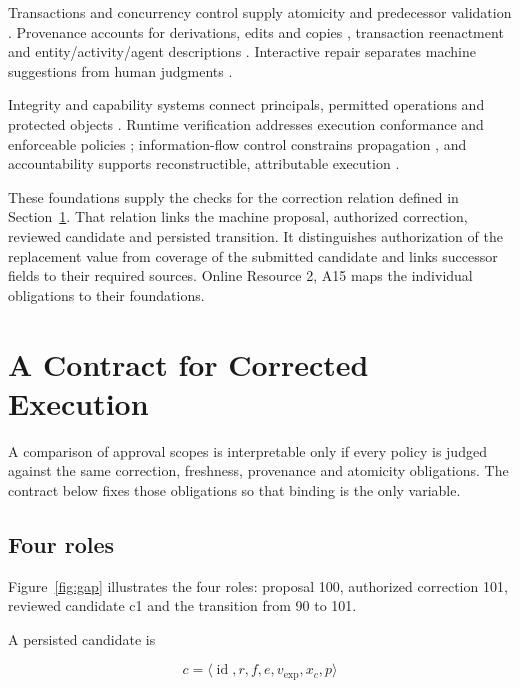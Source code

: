 \documentclass[pdflatex,sn-basic]{sn-jnl}
\begin{document}
Transactions and concurrency control supply atomicity and predecessor validation \citep{gray-transaction,kung-occ}. Provenance accounts for derivations, edits and copies \citep{buneman-provenance,cheney-provenance,buneman-curated}, transaction reenactment \citep{arab-reenactment} and entity/activity/agent descriptions \citep{prov-dm}. Interactive repair separates machine suggestions from human judgments \citep{yakout-guided-repair,falcon-cleaning}.

Integrity and capability systems connect principals, permitted operations and protected objects \citep{clark-wilson,hardy-confused-deputy,miller-robust-composition}. Runtime verification addresses execution conformance and enforceable policies \citep{runtime-verification,policy-enforcement}; information-flow control constrains propagation \citep{ifc}, and accountability supports reconstructible, attributable execution \citep{accountability}.

These foundations supply the checks for the correction relation defined in Section~\ref{a-contract-for-corrected-execution}. That relation links the machine proposal, authorized correction, reviewed candidate and persisted transition. It distinguishes authorization of the replacement value from coverage of the submitted candidate and links successor fields to their required sources. Online Resource 2, A15 maps the individual obligations to their foundations.

\section{A Contract for Corrected Execution}\label{a-contract-for-corrected-execution}

A comparison of approval scopes is interpretable only if every policy is judged against the same correction, freshness, provenance and atomicity obligations. The contract below fixes those obligations so that binding is the only variable.

\subsection{Four roles}\label{four-roles}

Figure~\ref{fig:gap} illustrates the four roles: proposal 100, authorized correction 101, reviewed candidate c1 and the transition from 90 to 101.

A persisted candidate is

\[
c = \langle \operatorname{id}, r, f, e, v_{\mathrm{exp}}, x_c, p\rangle
\]
\end{document}
